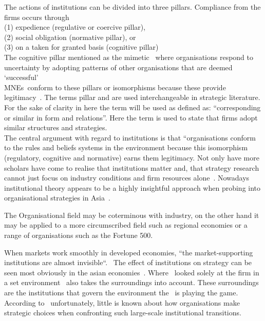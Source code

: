 \noindent
The actions of institutions can be divided into three pillars. 
Compliance from the firms occurs through \\
(1) expedience (regulative or coercive pillar),\\
(2) social obligation (normative pillar), or \\
(3) on a taken for granted basis (cognitive pillar) \\
 
 The cognitive pillar mentioned as the mimetic \iso~where organisations respond to uncertainty by adopting patterns of other organisations that are deemed `successful'~\cite{Westney:2005,Peng:2008,Kostova:1999,DiMaggio:1983,Scott:1995}\\ 
\glspl{MNE}~conform to these pillars or isomorphisms because these provide legitimacy~\cite{Powell:1991}.
The terms pillar and \iso are used interchangeable in strategic literature. 
For the sake of clarity in here the term \iso will be used as defined as: ``corresponding or similar in form and relations''. Here the term is used to state that firms adopt similar structures and strategies.\\

The central argument with regard to institutions is that “organisations conform to the rules and beliefs systems in the environment because this isomorphism (regulatory, cognitive and normative) earns them legitimacy.
Not only have more scholars have come to realise that institutions matter and, that strategy research cannot just focus on industry conditions and firm resources alone~\cite{Powell:1991,Scott:1995}.
Nowadays institutional theory appears to be a highly insightful approach when probing into organisational strategies in Asia~\cite{Hoskisson:2000}.


\cite{Westney:2005} The Organisational field may be coterminous with industry, on the other hand it may be applied to a more circumscribed field such as regional economies or a range of organisations such as the Fortune 500.


 


When markets work smoothly in developed economies, ``the market-supporting institutions are almost invisible``.~\cite{McMillan:2008}
The effect of institutions on strategy can be seen most obviously in the asian economies~\cite{Peng:2002}.
Where \rbv~looked solely at the firm in a set environment \ibv~also takes the surroundings into account. These surroundings are the institutions that govern the environment the \mne~is playing the game. \\

According to~\cite{Peng:2003} unfortunately, little is known about how organisations make strategic choices when confronting such large-scale institutional transitions.